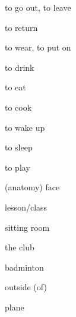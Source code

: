 \begin{flashcard}{\LARGE to go out, to leave}
\LARGE {}
\end{flashcard}
\begin{flashcard}{\LARGE to return}
\LARGE {}
\end{flashcard}
\begin{flashcard}{\LARGE to wear, to put on}
\LARGE {}
\end{flashcard}
\begin{flashcard}{\LARGE to drink}
\LARGE {}
\end{flashcard}
\begin{flashcard}{\LARGE to eat}
\LARGE {}
\end{flashcard}
\begin{flashcard}{\LARGE to cook}
\LARGE {}
\end{flashcard}
\begin{flashcard}{\LARGE to wake up}
\LARGE {}
\end{flashcard}
\begin{flashcard}{\LARGE to sleep}
\LARGE {}
\end{flashcard}
\begin{flashcard}{\LARGE to play}
\LARGE {}
\end{flashcard}
\begin{flashcard}{\LARGE (anatomy) face}
\LARGE {}
\end{flashcard}
\begin{flashcard}{\LARGE lesson/class}
\LARGE {}
\end{flashcard}
\begin{flashcard}{\LARGE sitting room}
\LARGE {}
\end{flashcard}
\begin{flashcard}{\LARGE the club}
\LARGE {}
\end{flashcard}
\begin{flashcard}{\LARGE badminton}
\LARGE {}
\end{flashcard}
\begin{flashcard}{\LARGE outside (of)}
\LARGE {}
\end{flashcard}
\begin{flashcard}{\LARGE plane}
\LARGE {}
\end{flashcard}

